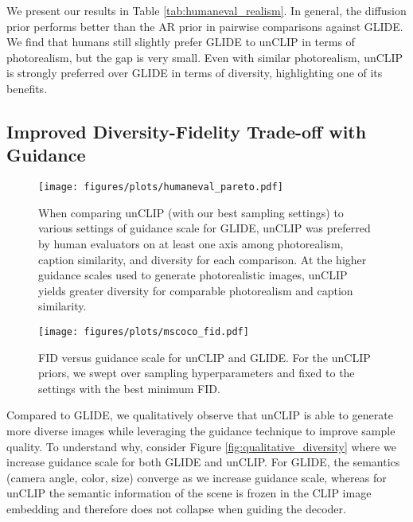 \documentclass{article}
\newcommand{\modelname}{unCLIP}
\begin{document}
We present our results in Table \ref{tab:humaneval_realism}. In general, the diffusion prior performs better than the AR prior in pairwise comparisons against GLIDE. We find that humans still slightly prefer GLIDE to \modelname{} in terms of photorealism, but the gap is very small. Even with similar photorealism, \modelname{} is strongly preferred over GLIDE in terms of diversity, highlighting one of its benefits.

\subsection{Improved Diversity-Fidelity Trade-off with Guidance}
\label{sec:tradeoff}
\begin{figure}[t]
    \begin{center}
    \texttt{[image: figures/plots/humaneval\_pareto.pdf]}
    \end{center}
    \vskip -0.1in
    \caption{When comparing \modelname{} (with our best sampling settings) to various settings of guidance scale for GLIDE, \modelname{} was preferred by human evaluators on at least one axis among photorealism, caption similarity, and diversity for each comparison. At the higher guidance scales used to generate photorealistic images, unCLIP yields greater diversity for comparable photorealism and caption similarity.}
    \label{fig:humaneval_pareto}
    \vskip -0.1in
\end{figure}

\begin{figure}[t]
    \begin{center}
    \texttt{[image: figures/plots/mscoco\_fid.pdf]}
    \end{center}
    \vskip -0.1in
    \caption{FID versus guidance scale for \modelname{} and GLIDE. For the \modelname{} priors, we swept over sampling hyperparameters and fixed to the settings with the best minimum FID.}
    \label{fig:fid_plot}
    \vskip -0.1in
\end{figure}

Compared to GLIDE, we qualitatively observe that unCLIP is able to generate more diverse images while leveraging the guidance technique to improve sample quality. To understand why, consider Figure \ref{fig:qualitative_diversity} where we increase guidance scale for both GLIDE and \modelname{}. For GLIDE, the semantics (camera angle, color, size) converge as we increase guidance scale, whereas for \modelname{} the semantic information of the scene is frozen in the CLIP image embedding and therefore does not collapse when guiding the decoder. 
\end{document}
